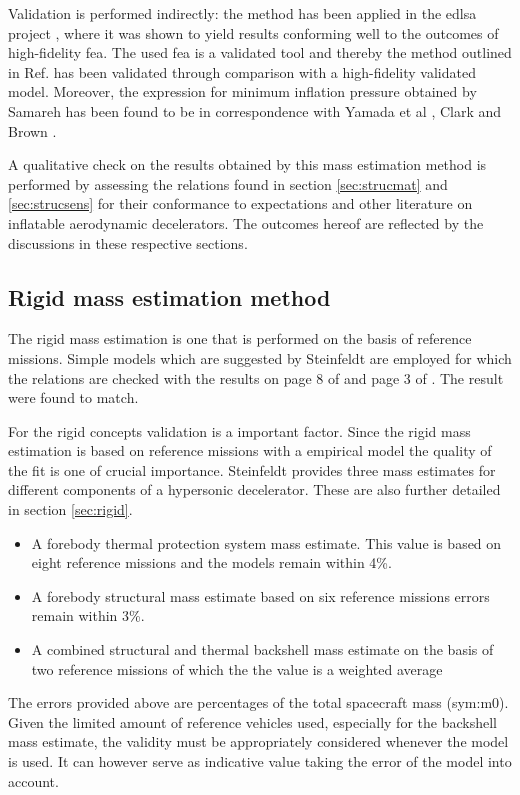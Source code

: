 Validation is performed indirectly: the method \cite{Samareh2011} has been applied in the \gls{edlsa} project \cite{Cianciolo2010}, where it was shown to yield results conforming well to the outcomes of high-fidelity \gls{fea}. The used \gls{fea} is a validated tool \cite{Cianciolo2010} and thereby the method outlined in Ref.\cite{Samareh2011} has been validated through comparison with a high-fidelity validated model. Moreover, the expression for minimum inflation pressure obtained by Samareh has been found to be in correspondence with Yamada et al \cite{Yamada2009}, Clark \cite{Clark2009} and Brown \cite{Brown2009}.

A qualitative check on the results obtained by this mass estimation method is performed by assessing the relations found in section \ref{sec:strucmat} and \ref{sec:strucsens} for their conformance to expectations and other literature on inflatable aerodynamic decelerators. The outcomes hereof are reflected by the discussions in these respective sections.


\subsection{Rigid mass estimation method}
The rigid mass estimation is one that is performed on the basis of reference missions. Simple models which are suggested by Steinfeldt \cite{Steinfeldt2009} are employed for which the relations are checked with the results on page 8 of \cite{Steinfeldt2009} and page 3 of \cite{Laub2004}. The result were found to match.

For the rigid concepts validation is a important factor. Since the rigid mass estimation is based on reference missions with a empirical model the quality of the fit is one of crucial importance.
Steinfeldt provides three mass estimates for different components of a hypersonic decelerator. These are also further detailed in section \ref{sec:rigid}.

\begin{itemize}
\item A forebody thermal protection system mass estimate. This value is based on eight reference missions and the models remain within 4\%.
\item A forebody structural mass estimate based on six reference missions errors remain within 3\%.
\item A combined structural and thermal backshell mass estimate on the basis of two reference missions of which the the value is a weighted average
\end{itemize}

The errors provided above are percentages of the total spacecraft mass (\gls{sym:m0}). Given the limited amount of reference vehicles used, especially for the backshell mass estimate, the validity must be appropriately considered whenever the model is used. It can however serve as indicative value taking the error of the model into account.